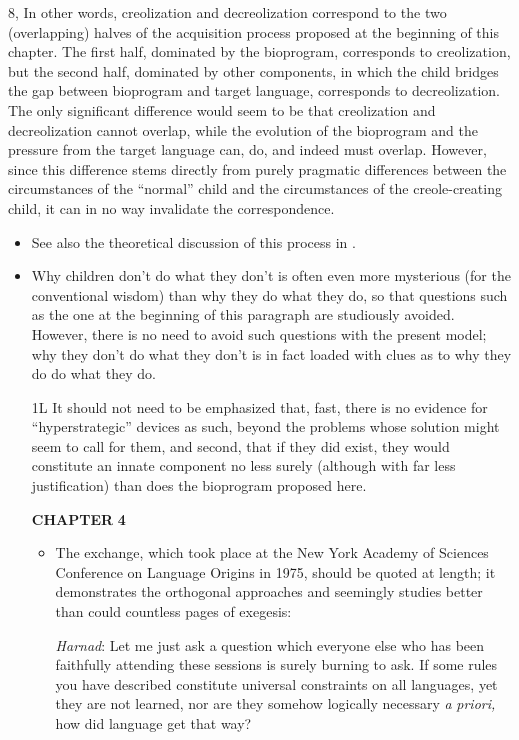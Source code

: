 \begin{itemize}
\begin{itemize}
\begin{itemize}
\begin{itemize}
\begin{itemize}
\begin{itemize}
\begin{itemize}
\begin{itemize}
\begin{itemize}
\begin{itemize}
8, In other words, creolization and decreolization correspond to the two (overlapping) halves of the acquisition process proposed at the beginning of this chapter. The first half, dominated by the bio\-program, corresponds to creolization, but the second half, dominated by other components, in which the child bridges the gap between bioprogram and target language, corresponds to decreolization. The only significant difference would seem to be that creolization and decreolization cannot overlap, while the evolution of the bioprogram and the pressure from the target language can, do, and indeed must overlap. However, since this difference stems directly from purely pragmatic differences between the circumstances of the ``normal'' child and the circumstances of the creole-creating child, it can in no way invalidate the correspondence.

\begin{itemize}
\item See also the theoretical discussion of this process in \citet{Bickerton1980}.
\item Why children don't do what they don't is often even more mysterious (for the conventional wisdom) than why they do what they do, so that questions such as the one at the beginning of this paragraph are studiously avoided. However, there is no need to avoid such questions with the present model; why they don't do what they don't is in fact loaded with clues as to why they do do what they do.

1L It should not need to be emphasized that, fast, there is no evidence for ``hyperstrategic'' devices as such, beyond the problems whose solution might seem to call for them, and second, that if they did exist, they would constitute an innate component no less surely (although with far less justification) than does the bioprogram proposed here.

\textbf{CHAPTER} \textbf{4}

\begin{itemize}
\item The exchange, which took place at the New York Academy of Sciences Conference on Language Origins in 1975, should be quoted at length; it demonstrates the orthogonal approaches and seemingly studies better than could countless pages of exegesis:

\textit{Harnad}: Let me just ask a question which everyone else who has been faithfully attending these sessions is surely burning to ask. If some rules you have described constitute universal constraints on all languages, yet they are not learned, nor are they somehow logically necessary \textit{a} \textit{priori,} how did language get that way?


\end{itemize}
\end{itemize}
\end{itemize}
\end{itemize}
\end{itemize}
\end{itemize}
\end{itemize}
\end{itemize}
\end{itemize}
\end{itemize}
\end{itemize}
\end{itemize}
